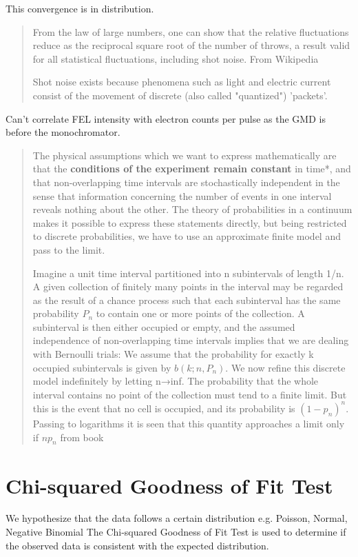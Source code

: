This convergence is in distribution.
\begin{quotation}
    From the law of large numbers, one can show that the relative fluctuations reduce as the reciprocal square root of the number of throws, a result valid for all statistical fluctuations, including shot noise. From Wikipedia
    
    Shot noise exists because phenomena such as light and electric current consist of the movement of discrete (also called "quantized") 'packets'.
\end{quotation}

Can't correlate FEL intensity with electron counts per pulse as the GMD is before the monochromator. 

\begin{quotation}
    The physical assumptions which we want to express mathematically are that the \textbf{conditions of the experiment remain constant} in time*, and that non-overlapping time intervals are stochastically independent in the sense that information concerning the number of events in one interval reveals nothing about the other. The theory of probabilities in a continuum makes it possible to express these statements directly, but being restricted to discrete probabilities, we have to use an approximate finite model and pass to the limit.

    Imagine a unit time interval partitioned into n subintervals of length 1/n. A given collection of finitely many points in the interval may be regarded as the result of a chance process such that each subinterval has the same probability $P_{n}$ to contain one or more points of the collection. A subinterval is then either occupied or empty, and the assumed independence of non-overlapping time intervals implies that we are dealing with Bernoulli trials: We assume that the probability for exactly k occupied subintervals is given by $b(k;n,P_{n})$. We now refine this discrete model indefinitely by letting n→inf. The probability that the whole interval contains no point of the collection must tend to a finite limit. But this is the event that no cell is occupied, and its probability is $(1-p_{n})^{n}$. Passing to logarithms it is seen that this quantity approaches a limit only if $np_{n}$
    from book \cite{fellerIntroductionProbabilityTheory1968}
\end{quotation}

\section{Chi-squared Goodness of Fit Test}
We hypothesize that the data follows a certain distribution e.g. Poisson, Normal, Negative Binomial The Chi-squared Goodness of Fit Test is used to determine if the observed data is consistent with the expected distribution.

